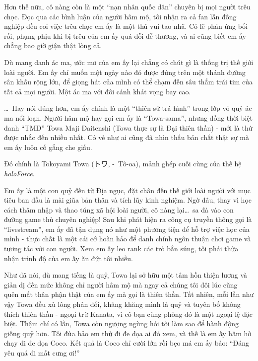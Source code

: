 \documentclass[../main.tex]{subfiles}
\begin{document}
Hơn thế nữa, cô nàng còn là một ``nạn nhân quốc dân'' chuyên bị mọi người trêu chọc. Đọc qua các bình luận của người hâm mộ, tôi nhận ra cả fan lẫn đồng nghiệp đều coi việc trêu chọc em ấy là một thú vui tao nhã. Có lẽ phản ứng bối rối, phụng phịu khi bị trêu của em ấy quá đỗi dễ thương, và ai cũng biết em ấy chẳng bao giờ giận thật lòng cả.

Dù mang danh ác ma, ước mơ của em ấy lại chẳng có chút gì là thống trị thế giới loài người. Em ấy chỉ muốn một ngày nào đó được đứng trên một thánh đường sân khấu rộng lớn, để giọng hát của mình có thể chạm đến sâu thẳm trái tim của tất cả mọi người. Một ác ma với đôi cánh khát vọng bay cao.

\dots\ Hay nói đúng hơn, em ấy chính là một ``thiên sứ trá hình'' trong lớp vỏ quỷ ác ma nổi loạn. Người hâm mộ hay gọi em ấy là ``Towa-sama'', nhưng đồng thời biệt danh ``TMD'' Towa Maji Daitenshi (Towa thực sự là Đại thiên thần) - mới là thứ được nhắc đến nhiều nhất. Có vẻ như ai cũng đã nhìn thấu bản chất thật sự mà em ấy luôn cố gắng che giấu.

\chrint


Đó chính là Tokoyami Towa (トワ, -\ Tô-oa), mảnh ghép cuối cùng của thế hệ \textit{holoForce}.

Em ấy là một con quỷ đến từ Địa ngục, đặt chân đến thế giới loài người với mục tiêu ban đầu là mài giũa bản thân và tích lũy kinh nghiệm. Ngờ đâu, thay vì học cách thâm nhập và thao túng xã hội loài người, cô nàng lại\dots\ sa đà vào con đường game thủ chuyên nghiệp! Sau khi phát hiện ra công cụ truyền thông gọi là ``livestream'', em ấy đã tận dụng nó như một phương tiện để hỗ trợ việc học của mình - thực chất là một cái cớ hoàn hảo để danh chính ngôn thuận chơi game và tương tác với con người. Xem em ấy leo rank các trò bắn súng, tôi phải thừa nhận trình độ của em ấy ăn đứt tôi nhiều.

Như đã nói, dù mang tiếng là quỷ, Towa lại sở hữu một tâm hồn thiện lương và giản dị đến mức không chỉ người hâm mộ mà ngay cả chúng tôi đôi lúc cũng quên mất thân phận thật của em ấy mà gọi là thiên thần. Tất nhiên, mỗi lần như vậy Towa đều xù lông phản đối, khăng khăng mình là quỷ và tuyên bố không thích thiên thần - ngoại trừ Kanata, vì cô bạn cùng phòng đó là một ngoại lệ đặc biệt. Thậm chí có lần, Towa còn ngượng ngùng hỏi tôi làm sao để hành động giống quỷ hơn. Tôi đùa bảo em thử đi đe dọa ai đó xem, và thế là em ấy hăm hở chạy đi đe dọa Coco. Kết quả là Coco chỉ cười lớn rồi bẹo má em ấy bảo: ``Đáng yêu quá đi mất cưng ơi!''
\end{document}
